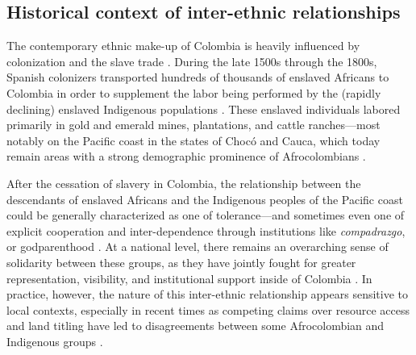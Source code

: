 \documentclass[bibauthoryear]{aa}
\begin{document}
\subsection{Historical context of inter-ethnic relationships}
The contemporary ethnic make-up of Colombia is heavily influenced by colonization and the slave trade \citep{Can00, wade2002introduction, castillo2009discourse}.  During the late 1500s through the 1800s, Spanish colonizers transported hundreds of thousands of enslaved Africans to Colombia in order to supplement the labor being performed by the (rapidly declining)  enslaved Indigenous populations \citep{slavenote, gilbertomurillo2001el}. 
 These enslaved individuals labored primarily in gold and emerald mines, plantations, and cattle ranches---most notably on the Pacific coast in the states of Choc\'o and Cauca, which today remain areas with a strong demographic prominence of Afrocolombians \citep{gilbertomurillo2001el, wade2002introduction}. 

After the cessation of slavery in Colombia, the relationship between the descendants of enslaved Africans and the Indigenous peoples  of the Pacific coast could be generally characterized as one of tolerance---and sometimes even one of explicit cooperation and inter-dependence through institutions like \textit{compadrazgo}, or godparenthood \citep{Cay73}. At a national level, there remains an overarching sense of solidarity between these groups, as they have jointly fought for greater representation, visibility, and institutional support inside of Colombia \citep{castillo2009discourse, iglesiasvoces}. In practice, however, the nature of this inter-ethnic relationship appears sensitive to local contexts, especially in recent times as competing claims over resource access and land titling have led to disagreements between some Afrocolombian and Indigenous groups \citep{ng2000titling, davis2002indigenous, garcia2009diversos, velasco2011contested}. 
 
\end{document}
